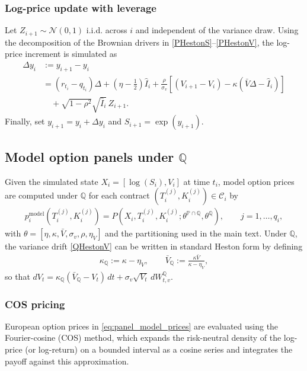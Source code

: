 \documentclass[11pt,a4paper,notitlepage]{article}
\numberwithin{equation}{section}
\begin{document}
\subsubsection{Log-price update with leverage}
Let $Z_{i+1}\sim\mathcal{N}(0,1)$ i.i.d. across $i$ and independent of the variance draw.
Using the decomposition of the Brownian drivers in \eqref{PHestonS}--\eqref{PHestonV},
the log-price increment is simulated as
\begin{align}
\Delta y_i
&:= y_{i+1}-y_i \nonumber\\
&= (r_{t_i}-q_{t_i})\Delta
+ \left(\eta-\frac{1}{2}\right)\widehat{I}_i
+ \frac{\rho}{\sigma_v}\left[\left(V_{i+1}-V_i\right)-\kappa\left(\bar{V}\Delta-\widehat{I}_i\right)\right] \nonumber\\
&\quad + \sqrt{1-\rho^2}\sqrt{\widehat{I}_i}\,Z_{i+1}.
\label{eq:logS_update}
\end{align}
Finally, set $y_{i+1}=y_i+\Delta y_i$ and $S_{i+1}=\exp(y_{i+1})$.

\subsection{Model option panels under $\mathbb{Q}$}
Given the simulated state $X_i=[\log(S_i),V_i]$ at time $t_i$, model option prices are computed under
$\mathbb{Q}$ for each contract $(T_i^{(j)},K_i^{(j)})\in\mathcal{C}_i$ by
\begin{align}
p_{i}^{\mathrm{model}}(T_i^{(j)},K_i^{(j)})
= P\!\left(X_i,T_i^{(j)},K_i^{(j)};\theta^{\mathbb{P}\cap\mathbb{Q}},\theta^{\mathbb{Q}}\right),
\qquad j=1,\dots,q_i,
\label{eq:panel_model_prices}
\end{align}
with $\theta=[\eta,\kappa,\bar V,\sigma_v,\rho,\eta_V]$ and the partitioning used in the main text.
Under $\mathbb{Q}$, the variance drift \eqref{QHestonV} can be written in standard Heston form by defining
\begin{align}
\kappa_{\mathbb{Q}} := \kappa-\eta_V,
\qquad
\bar V_{\mathbb{Q}} := \frac{\kappa\bar V}{\kappa-\eta_V},
\end{align}
so that $dV_t=\kappa_{\mathbb{Q}}(\bar V_{\mathbb{Q}}-V_t)\,dt+\sigma_v\sqrt{V_t}\,dW^{\mathbb{Q}}_{t,v}$.

\subsubsection{COS pricing}
European option prices in \eqref{eq:panel_model_prices} are evaluated using the Fourier-cosine (COS)
method, which expands the risk-neutral density of the log-price (or log-return) on a bounded interval
as a cosine series and integrates the payoff against this approximation.
\end{document}
